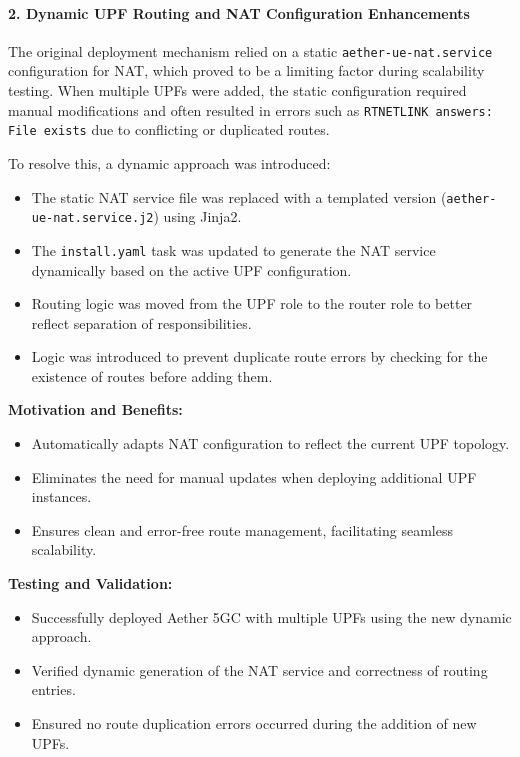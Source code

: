 \paragraph{2. Dynamic UPF Routing and NAT Configuration Enhancements}  
The original deployment mechanism relied on a static \texttt{aether-ue-nat.service} configuration for NAT, which proved to be a limiting factor during scalability testing. When multiple UPFs were added, the static configuration required manual modifications and often resulted in errors such as \texttt{RTNETLINK answers: File exists} due to conflicting or duplicated routes.

To resolve this, a dynamic approach was introduced:
\begin{itemize}\raggedright
    \item The static NAT service file was replaced with a templated version (\texttt{aether-ue-nat.service.j2}) using Jinja2.
    \item The \texttt{install.yaml} task was updated to generate the NAT service dynamically based on the active UPF configuration.
    \item Routing logic was moved from the UPF role to the router role to better reflect separation of responsibilities.
    \item Logic was introduced to prevent duplicate route errors by checking for the existence of routes before adding them.
\end{itemize}

\textbf{Motivation and Benefits:}
\begin{itemize}
    \item Automatically adapts NAT configuration to reflect the current UPF topology.
    \item Eliminates the need for manual updates when deploying additional UPF instances.
    \item Ensures clean and error-free route management, facilitating seamless scalability.
\end{itemize}

\textbf{Testing and Validation:}
\begin{itemize}
    \item Successfully deployed Aether 5GC with multiple UPFs using the new dynamic approach.
    \item Verified dynamic generation of the NAT service and correctness of routing entries.
    \item Ensured no route duplication errors occurred during the addition of new UPFs.
\end{itemize}

